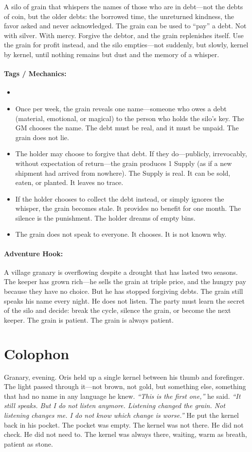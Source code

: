 A silo of grain that whispers the names of those who are in debt---not the debts of coin, but the older debts: the borrowed time, the unreturned kindness, the favor asked and never acknowledged. The grain can be used to ``pay''{} a debt. Not with silver. With mercy. Forgive the debtor, and the grain replenishes itself. Use the grain for profit instead, and the silo empties---not suddenly, but slowly, kernel by kernel, until nothing remains but dust and the memory of a whisper.

\paragraph{Tags / Mechanics:}
\begin{itemize}
\item [HEAL] [TRUTH] [SILENCE]
\item Once per week, the grain reveals one name---someone who owes a debt (material, emotional, or magical) to the person who holds the silo's key. The GM chooses the name. The debt must be real, and it must be unpaid. The grain does not lie.
\item The holder may choose to forgive that debt. If they do---publicly, irrevocably, without expectation of return---the grain produces 1 Supply (as if a new shipment had arrived from nowhere). The Supply is real. It can be sold, eaten, or planted. It leaves no trace.
\item If the holder chooses to collect the debt instead, or simply ignores the whisper, the grain becomes stale. It provides no benefit for one month. The silence is the punishment. The holder dreams of empty bins.
\item The grain does not speak to everyone. It chooses. It is not known why.
\end{itemize}

\paragraph{Adventure Hook:}
A village granary is overflowing despite a drought that has lasted two seasons. The keeper has grown rich---he sells the grain at triple price, and the hungry pay because they have no choice. But he has stopped forgiving debts. The grain still speaks his name every night. He does not listen. The party must learn the secret of the silo and decide: break the cycle, silence the grain, or become the next keeper. The grain is patient. The grain is always patient.

\section*{Colophon}
Granary, evening. Oris held up a single kernel between his thumb and forefinger. The light passed through it---not brown, not gold, but something else, something that had no name in any language he knew. \textit{``This is the first one,''} he said. \textit{``It still speaks. But I do not listen anymore. Listening changed the grain. Not listening changes me. I do not know which change is worse.''} He put the kernel back in his pocket. The pocket was empty. The kernel was not there. He did not check. He did not need to. The kernel was always there, waiting, warm as breath, patient as stone.